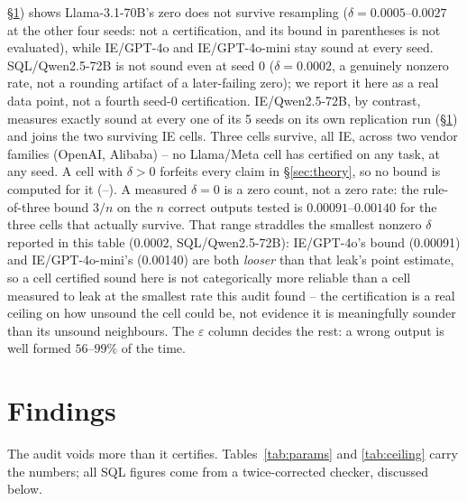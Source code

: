 \documentclass[11pt]{article}
\begin{document}
\begin{table}[t]
{\S\ref{sec:results}) shows Llama-3.1-70B's zero does not survive resampling
($\delta=0.0005$--$0.0027$ at the other four seeds: not a
certification, and its bound in parentheses is not evaluated), while
IE/GPT-4o and IE/GPT-4o-mini stay sound at every seed. SQL/Qwen2.5-72B is
not sound even at seed 0 ($\delta=0.0002$, a genuinely nonzero rate, not a
rounding artifact of a later-failing zero); we report it here as a real
data point, not a fourth seed-0 certification. IE/Qwen2.5-72B, by
contrast, measures exactly sound at every one of its 5 seeds on its own
replication run (\S\ref{sec:results}) and joins the two surviving IE
cells. Three cells survive, all IE, across two vendor
families (OpenAI, Alibaba) -- no Llama/Meta cell has certified on any
task, at any seed. A cell with $\delta>0$ forfeits every claim in
\S\ref{sec:theory}, so no bound is computed for it ({--}). A measured
$\delta=0$ is a zero count, not a zero rate: the rule-of-three bound
$3/n$ on the $n$ correct outputs tested is $0.00091$--$0.00140$ for the
three cells that actually survive. That range straddles the smallest nonzero
$\delta$ reported in this table (0.0002, SQL/Qwen2.5-72B): IE/GPT-4o's
bound (0.00091) and IE/GPT-4o-mini's (0.00140) are both \emph{looser} than
that leak's point estimate, so a cell certified sound here is not
categorically more reliable than a cell measured to leak at the smallest
rate this audit found -- the certification is a real ceiling on how
unsound the cell could be, not evidence it is meaningfully sounder than
its unsound neighbours. The
$\varepsilon$ column decides the rest: a wrong output is well formed
$56$--$99\%$ of the time.}
\label{tab:ceiling}
\end{table}

\section{Findings}\label{sec:results}
The audit voids more than it certifies. Tables~\ref{tab:params} and
\ref{tab:ceiling} carry the numbers; all SQL figures come from a twice-corrected
checker, discussed below.
\end{document}
